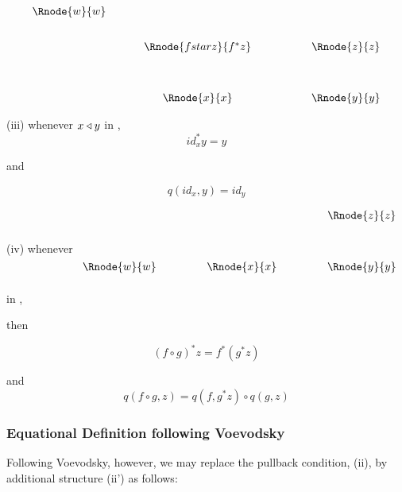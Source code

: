 \documentclass[10pt,a4paper]{scrartcl}
\begin{document}
\vspace{3mm}
\begin{center}
\begin{displaymath}
\begin{array}{cp{0.5cm}cp{1.2cm}c}
\Rnode{w}{w} &&                     &&           \\ [0.7cm]
             &&\Rnode{fstarz}{f^*z} && \Rnode{z}{z}\\ [1.2cm]
             &&\Rnode{x}{x}         && \Rnode{y}{y}
\end{array}
\end{displaymath}
\setlength{\arrnodesepA}{3pt}
\end{center}

 

\vspace {0.25cm}
\noindent (iii) whenever $x \triangleleft y$ in , 
\begin{equation}
id_x^*y=y
\end{equation}

and

\begin{equation}
q(id_x,y) = id_y
\end{equation}
\vspace{0.2cm}

\noindent (iv) whenever 
$
\begin{array}{c p{.9cm} c p{.9cm} c}
             &   &             &   & \Rnode{z}{z} \\ [1.2cm]
\Rnode{w}{w} &   &\Rnode{x}{x} &   & \Rnode{y}{y} \\ [0.5cm]
\end{array}
$
in , 

then

\begin{equation}
(f \circ g)^*z =  f^* (g ^* z)
\end{equation}

and 
\begin{equation}
q(f \circ g,z) = q(f,g^*z) \circ q(g,z)
\end{equation}


\subsubsection{Equational Definition following Voevodsky}
Following Voevodsky, however, we may replace the pullback condition, (ii), by additional structure (ii') as follows:
\end{document}
